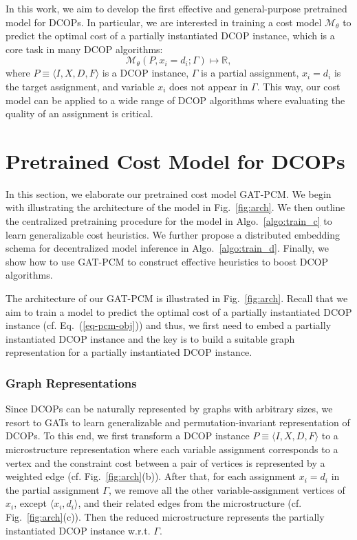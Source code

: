 \documentclass[letterpaper]{article} %
\begin{document}
In this work, we aim to develop the first effective and general-purpose pretrained model for DCOPs. In particular, we are interested in training a cost model $\mathcal{M}_\theta$ to predict the optimal cost of a partially instantiated DCOP instance, which is a core task in many DCOP algorithms:
\begin{equation}
\mathcal{M}_\theta(P,x_i=d_i;\Gamma)\mapsto \mathbb{R}, \label{eq-pcm-obj}
\end{equation}
where $P\equiv\langle I,X,D,F\rangle$ is a DCOP instance, $\Gamma$ is a partial assignment, $x_i=d_i$ is the target assignment, and variable $x_i$ does not appear in $\Gamma$. This way, our cost model can be applied to a wide range of DCOP algorithms where evaluating the quality of an assignment is critical.

\section{Pretrained Cost Model for DCOPs}
In this section, we elaborate our pretrained cost model GAT-PCM. We begin with illustrating the architecture of the model in Fig.~\ref{fig:arch}. We then outline the centralized pretraining procedure for the model in Algo.~\ref{algo:train_c} to learn generalizable cost heuristics. We further propose a distributed embedding schema for decentralized model inference in Algo.~\ref{algo:train_d}.
Finally, we show how to use GAT-PCM to construct effective heuristics to boost DCOP algorithms.

The architecture of our GAT-PCM is illustrated in Fig.~\ref{fig:arch}.
Recall that we aim to train a model to predict the optimal cost of a partially instantiated DCOP instance (cf. Eq.~(\ref{eq-pcm-obj})) and thus, we first need to embed a partially instantiated DCOP instance and the key is to build a suitable graph representation for a partially instantiated DCOP instance.
\subsubsection{Graph Representations}
Since DCOPs can be naturally represented by graphs with arbitrary sizes, we resort to GATs to learn generalizable and permutation-invariant representation of DCOPs.
To this end, we first transform a DCOP instance $P\equiv\langle I,X,D,F\rangle$ to a microstructure representation \cite{jegou1993decomposition} where each variable assignment corresponds to a vertex and
the constraint cost between a pair of vertices is represented by a weighted edge (cf. Fig.~\ref{fig:arch}(b)). After that, for each assignment $x_i= d_i$ in the partial assignment $\Gamma$, we remove all the other variable-assignment vertices of $x_i$, except $\langle x_i, d_i\rangle$, and their related edges from the microstructure (cf. Fig.~\ref{fig:arch}(c)). Then the reduced microstructure represents the partially instantiated DCOP instance w.r.t. $\Gamma$.
\end{document}
